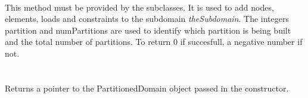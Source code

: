 \\
This method must be provided by the subclasses. It is used to add
nodes, elements, loads and constraints to the subdomain {\em
theSubdomain}. The integers \p partition and \p numPartitions
are used to identify which partition is being built and the total
number of partitions. To return $0$ if succesfull, a negative number
if not. \\


 \\
 \\
Returns a pointer to the PartitionedDomain object passed in the constructor.\\


